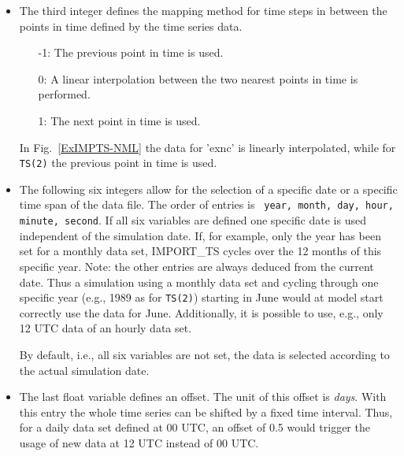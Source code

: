 \documentclass[11pt,twoside]{report}
\begin{document}
\begin{itemize}
(\verb|TS(1)|) is reached. For \verb|TS(2)|, the simulation will be
continued after 1990, as the second integer flag is set to 1. In this case,
IMPORT\_TS would provide the data for 1990 for all dates later than 1990.
\item The third integer defines the mapping method for time steps in 
between the points in time defined by the time series data. 
\begin{itemize}
\item[-1:] The previous point in time is used.
\item[ 0:] A linear interpolation between the two nearest points in time is performed.
\item[ 1:] The next point in time is used.
\end{itemize}
In Fig.~\ref{ExIMPTS-NML} the data for 'exnc' is linearly interpolated, while
for \verb|TS(2)| the previous point in time is used.
\item The following six integers allow for the selection of a specific date
or a specific time span of the data file. The order of entries is
\verb| year, month, day, hour, minute, second|.
If all six variables are defined one specific date is used independent of the
simulation date. If, for example, only the year has been set for a monthly
 data set, IMPORT\_TS cycles over the 12 months of this specific year.
Note: the other entries are always deduced from the current date. Thus a 
simulation using a monthly data set and cycling through one specific year
(e.g., 1989 as for \verb|TS(2)|) starting in June would at model start 
 correctly use the data for June. Additionally, it is possible to use, e.g.,
 only 12 UTC data of an hourly data set.

By default, i.e., all six variables are not set, the data is selected
according to the actual simulation date.
\item The last float variable defines an offset. The unit of this offset is 
{\it days}. With this entry the whole time series can be shifted by a fixed
time interval. Thus, for a daily data set defined at 00 UTC,
 an offset of 0.5 would trigger
the usage of new data at 12 UTC instead of 00 UTC. 
\end{itemize}
\end{document}
